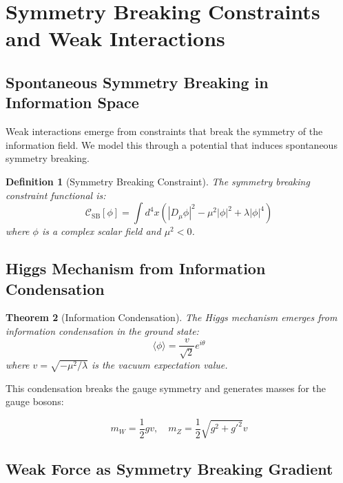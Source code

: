 \documentclass[11pt,a4paper]{article}
\newtheorem{theorem}{Theorem}
\newtheorem{definition}[theorem]{Definition}
\begin{document}
\section{Symmetry Breaking Constraints and Weak Interactions}

\subsection{Spontaneous Symmetry Breaking in Information Space}

Weak interactions emerge from constraints that break the symmetry of the information field. We model this through a potential that induces spontaneous symmetry breaking.

\begin{definition}[Symmetry Breaking Constraint]
The symmetry breaking constraint functional is:
\begin{equation}
\mathcal{C}_{\text{SB}}[\phi] = \int d^4x \left( |D_{\mu}\phi|^2 - \mu^2 |\phi|^2 + \lambda |\phi|^4 \right)
\end{equation}
where $\phi$ is a complex scalar field and $\mu^2 < 0$.
\end{definition}

\subsection{Higgs Mechanism from Information Condensation}

\begin{theorem}[Information Condensation]
The Higgs mechanism emerges from information condensation in the ground state:
\begin{equation}
\langle \phi \rangle = \frac{v}{\sqrt{2}} e^{i\theta}
\end{equation}
where $v = \sqrt{-\mu^2/\lambda}$ is the vacuum expectation value.
\end{theorem}

This condensation breaks the gauge symmetry and generates masses for the gauge bosons:

\begin{equation}
m_W = \frac{1}{2} g v, \quad m_Z = \frac{1}{2} \sqrt{g^2 + g'^2} v
\end{equation}

\subsection{Weak Force as Symmetry Breaking Gradient}
\end{document}
